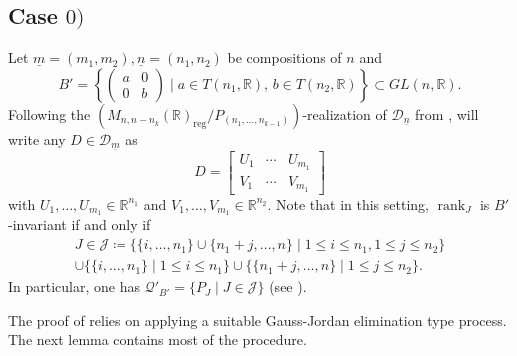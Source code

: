 \documentclass[pdftex]{sigma}
\numberwithin{equation}{section}
\theoremstyle{definition}
\newcommand{\rank}{\operatorname{rank}}
\newcommand{\R}{\mathbb{R}}
\newcommand{\D}{\mathcal{D}}
\newcommand{\T}{T}
\theoremstyle{plain}
\theoremstyle{plain}
\theoremstyle{plain}
\theoremstyle{plain}
\begin{document}
\subsection[Case 0)]{Case $0)$} \label{cas 0}

Let $\underline m = (m_1,m_2), \underline n = (n_1,n_2)$ be compositions of $n$ and
\begin{equation*}
	B' = \left\{\begin{pmatrix}
	a & 0 \\
	0 & b
\end{pmatrix} \mid a \in \T(n_1,\R), \, b \in \T(n_2,\R)\right\} \subset GL(n,\R).
\end{equation*}
Following the $(M_{n,n-n_k}(\R)_{\mathrm{reg}}/P_{(n_1,\dots,n_{k-1})})$-realization of $\D_{\underline n}$ from , will write any $D \in \D_{\underline m}$ as
\begin{equation*}
	D = \begin{bmatrix}
	U_{1} & \cdots & U_{m_1} \\
	V_{1} & \cdots & V_{m_1}
\end{bmatrix}
\end{equation*}
with $U_{1},\dots,U_{m_1} \in \R^{n_1}$ and $V_{1},\dots,V_{m_1} \in \R^{n_2}$.
Note that in this setting, $\rank_J$ is $B'$-invariant if and only if
\begin{multline*}
	J \in \mathcal J \coloneq \Big\{\{i,\dots,n_1\} \cup \{n_1+j,\dots,n\} \mid 1 \leqslant i \leqslant n_1, 1 \leqslant j \leqslant n_2\Big\} \\
	\cup \Big\{\{i,\dots,n_1\} \mid 1 \leqslant i \leqslant n_1\Big\} \cup \Big\{\{n_1+j,\dots,n\} \mid 1 \leqslant j \leqslant n_2\Big\}.
\end{multline*}
In particular, one has $\mathcal Q'_{B'} = \{P_J \mid J \in \mathcal J\}$ (see ).

The proof of  relies on applying a suitable Gauss-Jordan elimination type process. The next lemma contains most of the procedure.
\end{document}
